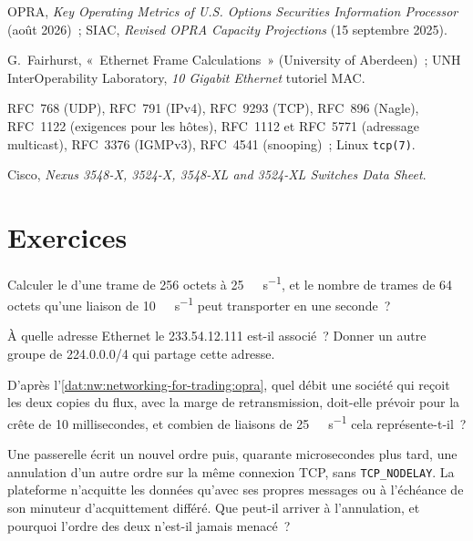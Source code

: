 \begin{omsources}
\item OPRA, \emph{Key Operating Metrics of U.S. Options Securities Information Processor} (août 2026)~; SIAC, \emph{Revised
OPRA Capacity Projections} (15 septembre 2025).
\item G.~Fairhurst, «~Ethernet Frame Calculations~» (University of Aberdeen)~; UNH InterOperability Laboratory, \emph{10
Gigabit Ethernet} tutoriel MAC.
\item RFC~768 (UDP), RFC~791 (IPv4), RFC~9293 (TCP), RFC~896 (Nagle), RFC~1122 (exigences pour les hôtes), RFC~1112 et RFC~5771
(adressage multicast), RFC~3376 (IGMPv3), RFC~4541 (snooping)~; Linux \texttt{tcp(7)}.
\item Cisco, \emph{Nexus 3548-X, 3524-X, 3548-XL and 3524-XL Switches Data Sheet}.
\end{omsources}

\section{Exercices}

\begin{exercise}[$\star$]\label{exo:nw:networking-for-trading:1}
Calculer le  d'une trame de 256 octets à \qty{25}{\giga\bit\per\second}, et le nombre de trames de 64 octets qu'une
liaison de \qty{10}{\giga\bit\per\second} peut transporter en une seconde~?
\end{exercise}

\begin{exercise}[$\star$]\label{exo:nw:networking-for-trading:2}
À quelle adresse Ethernet le  233.54.12.111 est-il associé~? Donner un autre groupe de 224.0.0.0/4 qui partage cette adresse.
\end{exercise}

\begin{exercise}[$\star$]\label{exo:nw:networking-for-trading:3}
D'après l'\cref{dat:nw:networking-for-trading:opra}, quel débit une société qui reçoit les deux copies du flux, avec la
marge de retransmission, doit-elle prévoir pour la crête de 10 millisecondes, et combien de liaisons de \qty{25}{\giga\bit\per\second} cela représente-t-il~?
\end{exercise}

\begin{exercise}[$\star\star$]\label{exo:nw:networking-for-trading:4}
Une passerelle écrit un nouvel ordre puis, quarante microsecondes plus tard, une annulation d'un autre ordre sur la même connexion TCP, sans
\texttt{TCP\_NODELAY}. La plateforme n'acquitte les données qu'avec ses propres messages ou à l'échéance de son minuteur d'acquittement différé. Que
peut-il arriver à l'annulation, et pourquoi l'ordre des deux n'est-il jamais menacé~?
\end{exercise}

